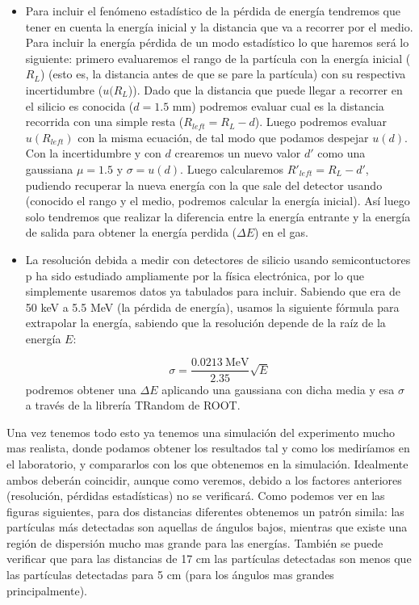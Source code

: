\documentclass[12pt,a4paper]{article}
\numberwithin{equation}{section}
\numberwithin{figure}{section}
\begin{document}
\begin{itemize}
    \item Para incluir el fenómeno estadístico de la pérdida de energía tendremos que tener en cuenta la energía inicial y la distancia que va a recorrer por el medio. Para incluir la energía pérdida de un modo estadístico lo que haremos será lo siguiente: primero evaluaremos el rango de la partícula con la energía inicial ($R_L$) (esto es, la distancia antes de que se pare la partícula) con su respectiva incertidumbre ($u(R_L$)). Dado que la distancia que puede llegar a recorrer en el silicio es conocida ($d=1.5$ mm) podremos evaluar cual es la distancia recorrida con una simple resta ($R_{left}=R_L-d$). Luego podremos evaluar $u(R_{left})$ con la misma ecuación, de tal modo que podamos despejar $u(d)$. Con la incertidumbre y con $d$ crearemos un nuevo valor $d'$ como una gaussiana $\mu=1.5$ y $\sigma=u(d)$. Luego calcularemos $R'_{left}=R_{L}-d'$, pudiendo recuperar la nueva energía con la que sale del detector usando (conocido el rango y el medio, podremos calcular la energía inicial). Así luego solo tendremos que realizar la diferencia entre la energía entrante y la energía de salida para obtener la energía perdida ($\Delta E$) en el gas. 
    
    \item La resolución debida a medir con detectores de silicio usando semicontuctores p ha sido estudiado ampliamente por la física electrónica, por lo que simplemente usaremos datos ya tabulados para incluir. Sabiendo que era de 50 keV a 5.5 MeV (la pérdida de energía), usamos la siguiente fórmula para extrapolar la energía, sabiendo que la resolución depende de la raíz de la energía $E$: 
    
    \begin{equation}
        \sigma = \frac{0.0213 \  \text{MeV}}{2.35} \sqrt{E}
    \end{equation}
    podremos obtener una $\Delta E$ aplicando una gaussiana con dicha media y esa $\sigma$ a través de la librería TRandom de ROOT. 

\end{itemize}




Una vez tenemos todo esto ya tenemos una simulación del experimento mucho mas realista, donde podamos obtener los resultados tal y como los mediríamos en el laboratorio, y compararlos con los que obtenemos en la simulación. Idealmente ambos deberán coincidir, aunque como veremos, debido a los factores anteriores (resolución, pérdidas estadísticas) no se verificará. Como podemos ver en las figuras siguientes, para dos distancias diferentes obtenemos un patrón simila: las partículas más detectadas son aquellas de ángulos bajos, mientras que existe una región de dispersión mucho mas grande para las energías. También se puede verificar que para las distancias de 17 cm las partículas detectadas son menos que las partículas detectadas para 5 cm (para los ángulos mas grandes principalmente). 
\end{document}
